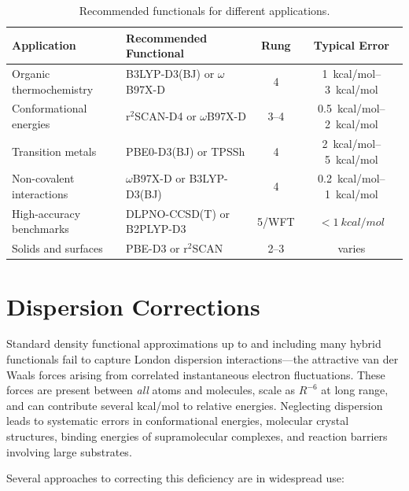 \documentclass[11pt]{article}
\numberwithin{equation}{section}
\begin{document}
\begin{table}[h]
\centering
\caption{Recommended functionals for different applications.}
\label{tab:functionals}
\begin{tabular}{llcc}
\toprule
\textbf{Application} & \textbf{Recommended Functional} & \textbf{Rung} & \textbf{Typical Error} \\
\midrule
Organic thermochemistry & B3LYP-D3(BJ) or $\omega$B97X-D & 4 & \SIrange{1}{3}{kcal/mol} \\
Conformational energies & r$^2$SCAN-D4 or $\omega$B97X-D & 3--4 & \SIrange{0.5}{2}{kcal/mol} \\
Transition metals & PBE0-D3(BJ) or TPSSh & 4 & \SIrange{2}{5}{kcal/mol} \\
Non-covalent interactions & $\omega$B97X-D or B3LYP-D3(BJ) & 4 & \SIrange{0.2}{1}{kcal/mol} \\
High-accuracy benchmarks & DLPNO-CCSD(T) or B2PLYP-D3 & 5/WFT & ${<}\SI{1}{kcal/mol}$ \\
Solids and surfaces & PBE-D3 or r$^2$SCAN & 2--3 & varies \\
\bottomrule
\end{tabular}
\end{table}


\section{Dispersion Corrections}
\label{sec:dispersion}

Standard density functional approximations up to and including many hybrid functionals fail to capture London dispersion interactions---the attractive van der Waals forces arising from correlated instantaneous electron fluctuations. These forces are present between \emph{all} atoms and molecules, scale as $R^{-6}$ at long range, and can contribute several kcal/mol to relative energies. Neglecting dispersion leads to systematic errors in conformational energies, molecular crystal structures, binding energies of supramolecular complexes, and reaction barriers involving large substrates.

Several approaches to correcting this deficiency are in widespread use:
\end{document}

